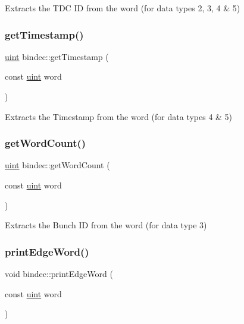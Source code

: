 Extracts the T\+DC ID from the word (for data types 2, 3, 4 \& 5) 

\mbox{\label{namespacebindec_ac7187bee4c7ad4848739d66e16a0f3e2}} 
\subsubsection{\texorpdfstring{get\+Timestamp()}{getTimestamp()}}
{\footnotesize\ttfamily \hyperlink{namespacebindec_a61700e6ffcfc677215bfdf223803e735}{uint} bindec\+::get\+Timestamp (\begin{DoxyParamCaption}\item[{const \hyperlink{namespacebindec_a61700e6ffcfc677215bfdf223803e735}{uint}}]{word }\end{DoxyParamCaption})\hspace{0.3cm}{\ttfamily [inline]}}



Extracts the Timestamp from the word (for data types 4 \& 5) 

\mbox{\label{namespacebindec_a41cf9d8a7714d845128193f21a9e8947}} 
\subsubsection{\texorpdfstring{get\+Word\+Count()}{getWordCount()}}
{\footnotesize\ttfamily \hyperlink{namespacebindec_a61700e6ffcfc677215bfdf223803e735}{uint} bindec\+::get\+Word\+Count (\begin{DoxyParamCaption}\item[{const \hyperlink{namespacebindec_a61700e6ffcfc677215bfdf223803e735}{uint}}]{word }\end{DoxyParamCaption})\hspace{0.3cm}{\ttfamily [inline]}}



Extracts the Bunch ID from the word (for data type 3) 

\mbox{\label{namespacebindec_a54d919f57f0eaa9df57df4b0ad8cdfc6}} 
\subsubsection{\texorpdfstring{print\+Edge\+Word()}{printEdgeWord()}}
{\footnotesize\ttfamily void bindec\+::print\+Edge\+Word (\begin{DoxyParamCaption}\item[{const \hyperlink{namespacebindec_a61700e6ffcfc677215bfdf223803e735}{uint}}]{word }\end{DoxyParamCaption})\hspace{0.3cm}{\ttfamily [inline]}}



